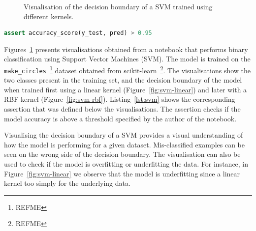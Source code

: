 \documentclass[acmsmall,screen,review,anonymous]{acmart}
\begin{document}
\begin{figure}
  \hfill
  \caption{Visualisation of the decision boundary of a SVM trained using different kernels.}
  \label{fig:svm}
\end{figure}

\begin{lstlisting}[language=Python]
assert accuracy_score(y_test, pred) > 0.95
\end{lstlisting}
\label{lst:svm}

Figures~\ref{fig:svm} presents visualisations obtained from a notebook that performs binary classification using Support Vector Machines (SVM). The model is trained on the \texttt{make\_circles}~\footnote{REFME} dataset obtained from scikit-learn~\footnote{REFME}. The visualisations show the two classes present in the training set, and the decision boundary of the model when trained first using a linear kernel (Figure~\ref{fig:svm-linear}) and later with a RBF kernel (Figure~\ref{fig:svm-rbf}). Listing~\ref{lst:svm} shows the corresponding assertion that was defined below the visualisations. The assertion checks if the model accuracy is above a threshold specified by the author of the notebook.

Visualising the decision boundary of a SVM provides a visual understanding of how the model is performing for a given dataset. Mis-classified examples can be seen on the wrong side of the decision boundary. The visualisation can also be used to check if the model is overfitting or underfitting the data. For instance, in Figure~\ref{fig:svm-linear} we observe that the model is underfitting since a linear kernel too simply for the underlying data.
\end{document}
